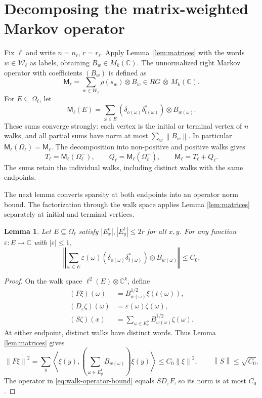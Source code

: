 \documentclass[a4paper,11pt]{amsproc}
\numberwithin{equation}{section}
\newtheorem{lemma}[theorem]{Lemma}
\theoremstyle{definition}
\newcommand{\C}{\mathbb C}
\newcommand{\cW}{\mathcal W}
\newcommand{\norm}[1]{\left\lVert#1\right\rVert}
\begin{document}
\section{Decomposing the matrix-weighted Markov operator}
Fix $\ell$ and write $n=n_\ell$, $r=r_\ell$. Apply Lemma~\ref{lem:matrices} with the words $w\in\cW_\ell$ as labels, obtaining $B_w\in M_k(\C)$. The unnormalized right Markov operator with coefficients $(B_w)$ is defined as
\begin{equation}\label{eq:markov-operator}
 \mathsf M_\ell=\sum_{w\in\cW_\ell}\rho(s_w)\otimes B_w
 \in RG\,\overline\otimes\,M_k(\C).
\end{equation}
For $E\subseteq\Omega_\ell$, let
\begin{equation}\label{eq:walk-restriction}
 \mathsf M_\ell(E)=\sum_{\omega\in E}
 (\delta_{o(\omega)}\delta_{t(\omega)}^*)\otimes B_{w(\omega)}.
\end{equation}
These sums converge strongly: each vertex is the initial or terminal vertex of $n$ walks, and all partial sums have norm at most $\sum_w\norm{B_w}$. In particular $\mathsf M_\ell(\Omega_\ell)=\mathsf M_\ell$. The decomposition into non-positive and positive walks gives
\begin{equation}\label{eq:tensor-operators}
 T_\ell=\mathsf M_\ell(\Omega_\ell^-),\qquad
 Q_\ell=\mathsf M_\ell(\Omega_\ell^+),\qquad
 \mathsf M_\ell=T_\ell+Q_\ell.
\end{equation}
The sums retain the individual walks, including distinct walks with the same endpoints.

The next lemma converts sparsity at both endpoints into an operator norm bound. The factorization through the walk space applies Lemma \ref{lem:matrices} separately at initial and terminal vertices.

\begin{lemma}\label{lem:walk-operator}
Let $E\subseteq\Omega_\ell$ satisfy $|E_x^o|,|E_y^t|\le2r$ for all $x,y$. For any function $\varepsilon:E\to\C$ with $|\varepsilon|\le1$,
\begin{equation}\label{eq:walk-operator-bound}
 \left\Vert\sum_{\omega\in E}\varepsilon(\omega)
 (\delta_{o(\omega)}\delta_{t(\omega)}^*)\otimes B_{w(\omega)}\right\Vert\le C_0.
\end{equation}
\end{lemma}
\begin{proof}
On the walk space $\ell^2(E)\otimes\C^k$, define
\[
 \begin{aligned}
 (F\xi)(\omega)&=B_{w(\omega)}^{1/2}\xi(t(\omega)),\\
 (D_\varepsilon\zeta)(\omega)&=\varepsilon(\omega)\zeta(\omega),\\
 (S\zeta)(x)&=\sum_{\omega\in E_x^o}B_{w(\omega)}^{1/2}\zeta(\omega).
 \end{aligned}
\]
At either endpoint, distinct walks have distinct words. Thus Lemma \ref{lem:matrices}  gives
\[
 \norm{F\xi}^2
 =\sum_y\left\langle\xi(y),
 \left(\sum_{\omega\in E_y^t}B_{w(\omega)}\right)\xi(y)\right\rangle
 \le C_0\norm{\xi}^2,
 \qquad \norm{S}\le\sqrt{C_0}.
\]
The operator in \eqref{eq:walk-operator-bound} equals $SD_\varepsilon F$, so its norm is at most $C_0$.
\end{proof}
\end{document}
